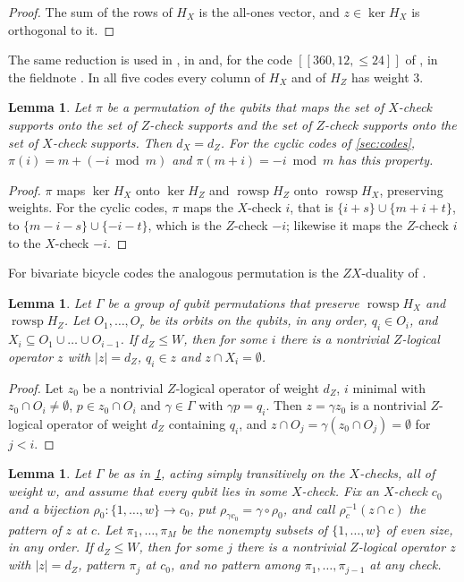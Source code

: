 \documentclass[11pt]{amsart}
\newtheorem{lemma}[theorem]{Lemma}
\theoremstyle{definition}
\theoremstyle{remark}
\newcommand{\rowsp}{\operatorname{rowsp}}
\begin{document}
\begin{proof}
The sum of the rows of $H_X$ is the all-ones vector, and $z\in\ker H_X$ is orthogonal to it.
\end{proof}

The same reduction is used in \cite[\S V-A]{OK26}, in \cite[App.~B.1]{LOMK26} and, for the code $[[360,12,\le24]]$ of \cite{B+24}, in the fieldnote \cite{Cro26}. In all five codes every column of $H_X$ and of $H_Z$ has weight $3$.

\begin{lemma}\label{lem:exchange}
Let $\pi$ be a permutation of the qubits that maps the set of $X$-check supports onto the set of $Z$-check supports and the set of $Z$-check supports onto the set of $X$-check supports. Then $d_X=d_Z$. For the cyclic codes of \cref{sec:codes}, $\pi(i)=m+(-i\bmod m)$ and $\pi(m+i)=-i\bmod m$ has this property.
\end{lemma}

\begin{proof}
$\pi$ maps $\ker H_X$ onto $\ker H_Z$ and $\rowsp H_Z$ onto $\rowsp H_X$, preserving weights. For the cyclic codes, $\pi$ maps the $X$-check $i$, that is $\{i+s\}\cup\{m+i+t\}$, to $\{m-i-s\}\cup\{-i-t\}$, which is the $Z$-check $-i$; likewise it maps the $Z$-check $i$ to the $X$-check $-i$.
\end{proof}

For bivariate bicycle codes the analogous permutation is the $ZX$-duality of \cite{B+24}.

\begin{lemma}\label{lem:anchors}
Let $\Gamma$ be a group of qubit permutations that preserve $\rowsp H_X$ and $\rowsp H_Z$. Let $O_1,\dots,O_r$ be its orbits on the qubits, in any order, $q_i\in O_i$, and $X_i\subseteq O_1\cup\dots\cup O_{i-1}$. If $d_Z\le W$, then for some $i$ there is a nontrivial $Z$-logical operator $z$ with $|z|=d_Z$, $q_i\in z$ and $z\cap X_i=\emptyset$.
\end{lemma}

\begin{proof}
Let $z_0$ be a nontrivial $Z$-logical operator of weight $d_Z$, $i$ minimal with $z_0\cap O_i\ne\emptyset$, $p\in z_0\cap O_i$ and $\gamma\in\Gamma$ with $\gamma p=q_i$. Then $z=\gamma z_0$ is a nontrivial $Z$-logical operator of weight $d_Z$ containing $q_i$, and $z\cap O_j=\gamma(z_0\cap O_j)=\emptyset$ for $j<i$.
\end{proof}

\begin{lemma}\label{lem:patterns}
Let $\Gamma$ be as in \cref{lem:anchors}, acting simply transitively on the $X$-checks, all of weight $w$, and assume that every qubit lies in some $X$-check. Fix an $X$-check $c_0$ and a bijection $\rho_0\colon\{1,\dots,w\}\to c_0$, put $\rho_{\gamma c_0}=\gamma\circ\rho_0$, and call $\rho_c^{-1}(z\cap c)$ the pattern of $z$ at $c$. Let $\pi_1,\dots,\pi_M$ be the nonempty subsets of $\{1,\dots,w\}$ of even size, in any order. If $d_Z\le W$, then for some $j$ there is a nontrivial $Z$-logical operator $z$ with $|z|=d_Z$, pattern $\pi_j$ at $c_0$, and no pattern among $\pi_1,\dots,\pi_{j-1}$ at any check.
\end{lemma}
\end{document}
